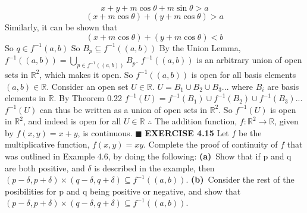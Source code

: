 \documentclass[12pt]{article}
\begin{document}
  \[x + y + m\cos \theta + m\sin \theta > a\]
  \[(x+ m\cos \theta) + (y + m\cos \theta) > a\]
  Similarly, it can be shown that
  \[(x+ m\cos \theta) + (y + m\cos \theta) < b\]
  So \(q \in f^{-1}(a,b)\)
  \newline
  So \(B_p \subseteq f^{-1}((a,b))\)
  \newline
  \newline
  By the Union Lemma, \(f^{-1}((a,b)) = \bigcup_{p \in f^{-1}((a,b))}B_p\).
  \newline
  \(f^{-1}((a,b))\) is an arbitrary union of open sets in \(\mathbb{R}^2\), which makes it open.
  \newline
  So \(f^{-1}((a,b))\) is open for all basis elements \((a,b) \in \mathbb{R}\).
  \newline \newline
  Consider an open set \(U \in \mathbb{R}\).
  \newline
  \(U = B_1 \cup B_2 \cup B_3...\) where \(B_i\) are basis elements in \(\mathbb{R}\).
  \newline
  By Theorem 0.22 \(f^{-1}(U) = f^{-1}(B_1) \cup f^{-1}(B_2) \cup f^{-1}(B_3)...\)
  \newline \newline
  \(f^{-1}(U)\) can thus be written as a union of open sets in \(\mathbb{R}^2\).
  \newline
  So \(f^{-1}(U)\) is open in \(\mathbb{R}^2\), and indeed is open for all \(U \in \mathbb{R}\)
  \newline \newline
  \(\therefore\) The addition function, \(f: \mathbb{R}^2 \rightarrow \mathbb{R}\), given by \(f(x,y) = x+y\), is continuous.
  \newline \(\blacksquare\)
  \newpage
  \noindent
  \textbf{EXERCISE 4.15}
  \newline
  Let \(f\) be the multiplicative function, \(f(x,y) = xy\). Complete the proof of continuity of \(f\) that was outlined in Example 4.6, by doing the following:
  \newline
  \textbf{(a)}\ Show that if p and q are both positive, and \(\delta\) is described in the example, then \((p-\delta, p+\delta) \times (q - \delta, q + \delta) \subseteq f^{-1}((a,b))\).
  \newline
  \textbf{(b)}\ Consider the rest of the posibilities for p and q being positive or negative, and show that \((p-\delta, p+\delta) \times (q - \delta, q + \delta) \subseteq f^{-1}((a,b))\).
  \newline
  \newline
\end{document}
